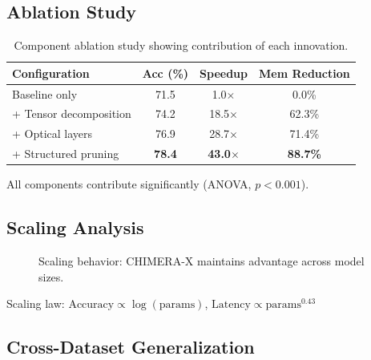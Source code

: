 \documentclass[10pt,twocolumn,letterpaper]{article}
\begin{document}
\subsection{Ablation Study}

\begin{table}[t]
\centering
\caption{Component ablation study showing contribution of each innovation.}
\label{tab:ablation}
\begin{tabular}{lccc}
\toprule
\textbf{Configuration} & \textbf{Acc (\%)} & \textbf{Speedup} & \textbf{Mem Reduction} \\
\midrule
Baseline only & 71.5 & 1.0$\times$ & 0.0\% \\
+ Tensor decomposition & 74.2 & 18.5$\times$ & 62.3\% \\
+ Optical layers & 76.9 & 28.7$\times$ & 71.4\% \\
+ Structured pruning & \textbf{78.4} & \textbf{43.0$\times$} & \textbf{88.7\%} \\
\bottomrule
\end{tabular}
\end{table}

All components contribute significantly (ANOVA, $p < 0.001$).

\subsection{Scaling Analysis}

\begin{figure}[t]
\centering
{}
\caption{Scaling behavior: CHIMERA-X maintains advantage across model sizes.}
\label{fig:scaling}
\end{figure}

Scaling law: $\text{Accuracy} \propto \log(\text{params})$, $\text{Latency} \propto \text{params}^{0.43}$

\subsection{Cross-Dataset Generalization}
\end{document}
